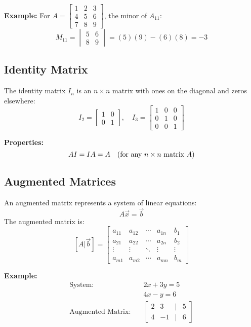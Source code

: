 \documentclass{article}
\begin{document}
\begin{multicols}{2}
\textbf{Example:}
For \( A = \begin{bmatrix} 1 & 2 & 3 \\ 4 & 5 & 6 \\ 7 & 8 & 9 \end{bmatrix} \), the minor of \( A_{11} \):
\[
M_{11} = \begin{vmatrix} 5 & 6 \\ 8 & 9 \end{vmatrix} = (5)(9) - (6)(8) = -3
\]

\subsection*{Identity Matrix}
The identity matrix \( I_n \) is an \( n \times n \) matrix with ones on the diagonal and zeros elsewhere:
\[
I_2 = \begin{bmatrix} 1 & 0 \\ 0 & 1 \end{bmatrix}, \quad I_3 = \begin{bmatrix} 1 & 0 & 0 \\ 0 & 1 & 0 \\ 0 & 0 & 1 \end{bmatrix}
\]

\textbf{Properties:}
\[
AI = IA = A \quad \text{(for any \( n \times n \) matrix \( A \))}
\]

\subsection*{Augmented Matrices}
An augmented matrix represents a system of linear equations:
\[
A \vec{x} = \vec{b}
\]
The augmented matrix is:
\[
[A|\vec{b}] = \begin{bmatrix} a_{11} & a_{12} & \cdots & a_{1n} & b_1 \\
                           a_{21} & a_{22} & \cdots & a_{2n} & b_2 \\
                           \vdots & \vdots & \ddots & \vdots & \vdots \\
                           a_{m1} & a_{m2} & \cdots & a_{mn} & b_m \end{bmatrix}
\]

\textbf{Example:}
\[
\begin{aligned}
\text{System:} \quad & 2x + 3y = 5 \\
                         & 4x -  y = 6 \\
\text{Augmented Matrix:} \quad & \begin{bmatrix} 2 & 3 & | & 5 \\
                                                         4 & -1 & | & 6 \end{bmatrix}
\end{aligned}
\]

\end{multicols}
\end{document}
